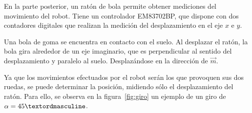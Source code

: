\documentclass[10pt,a4paper,hidelinks,twocolumn]{article}
\begin{document}
En la parte posterior, un ratón de bola permite obtener mediciones del movimiento del
robot. Tiene un controlador EM83702BP, que dispone con dos contadores digitales que
realizan la medición del desplazamiento en el eje $x$ e $y$.

Una bola de goma se encuentra en contacto con el suelo. Al desplazar el ratón, 
la bola gira alrededor de un eje imaginario, que es perpendicular al sentido del
desplazamiento y paralelo al suelo. Desplazándose en la dirección de $\vec{m}$.

Ya que los movimientos efectuados por el robot serán los que provoquen sus dos ruedas,
se puede determinar la posición, midiendo sólo el desplazamiento del ratón. Para ello,
se observa en la figura~\ref{fig:giro} un ejemplo de un giro de $\alpha = \RobotAngleº$.

\begin{center}
\end{center}
\end{document}
